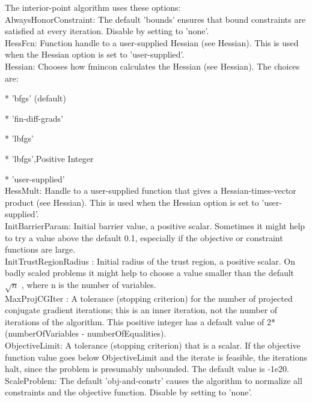 \documentclass[10pt]{article}
\begin{document}
The interior-point algorithm uses these options:\\

AlwaysHonorConstraint: The default 'bounds' ensures that bound constraints are satisfied at every iteration. Disable by setting to 'none'.\\

HessFcn: Function handle to a user-supplied Hessian (see Hessian). This is used when the Hessian option is set to 'user-supplied'.\\

Hessian: Chooses how fmincon calculates the Hessian (see Hessian). The choices are:

    * 'bfgs' (default)\

    * 'fin-diff-grads'\

    * 'lbfgs'\

    * {'lbfgs',Positive Integer}\

    * 'user-supplied'\\

HessMult: Handle to a user-supplied function that gives a Hessian-times-vector product (see Hessian). This is used when the Hessian option is set to 'user-supplied'.\\

InitBarrierParam: Initial barrier value, a positive scalar. Sometimes it might help to try a value above the default 0.1, especially if the objective or constraint functions are large.\\

InitTrustRegionRadius	: Initial radius of the trust region, a positive scalar. On badly scaled problems it might help to choose a value smaller than the default $\sqrt{n}$ , where n is the number of variables.\\

MaxProjCGIter	: A tolerance (stopping criterion) for the number of projected conjugate gradient iterations; this is an inner iteration, not the number of iterations of the algorithm. This positive integer has a default value of 2*(numberOfVariables - numberOfEqualities).\\

ObjectiveLimit: A tolerance (stopping criterion) that is a scalar. If the objective function value goes below ObjectiveLimit and the iterate is feasible, the iterations halt, since the problem is presumably unbounded. The default value is -1e20.\\

ScaleProblem: The default 'obj-and-constr' causes the algorithm to normalize all constraints and the objective function. Disable by setting to 'none'.\\
\end{document}
